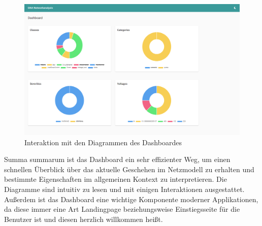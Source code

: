 \begin{figure}
    \centering
    \includegraphics[width=1\textwidth]{content/img/Empire/Frontend/Angular_Dashboard_Interaction_Prototype.png}
    \caption{Interaktion mit den Diagrammen des Dashboardes}
    \label{fig:PrototypeDashboardInteraction}
\end{figure}
\FloatBarrier

Summa summarum ist das Dashboard ein sehr effizienter Weg, um einen schnellen Überblick über das aktuelle Geschehen im Netzmodell zu erhalten und bestimmte Eigenschaften im allgemeinen Kontext zu interpretieren. Die Diagramme sind intuitiv zu lesen und mit einigen Interaktionen ausgestattet. Außerdem ist das Dashboard eine wichtige Komponente moderner Applikationen, da diese immer eine Art Landingpage beziehungsweise Einstiegsseite für die Benutzer ist und diesen herzlich willkommen heißt.